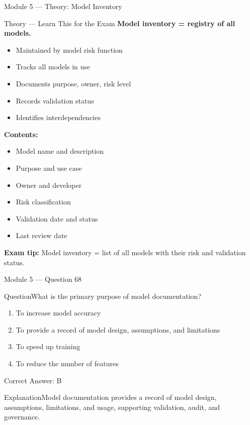 \documentclass[aspectratio=169,10pt]{beamer}
\newcommand{\question}[1]{\begin{block}{Question}#1\end{block}}
\newcommand{\options}[4]{%
	\begin{enumerate}[label=\Alph*.,leftmargin=*]
		\item #1
		\item #2
		\item #3
		\item #4
	\end{enumerate}
}
\newcommand{\answerbox}[1]{\begin{exampleblock}{Correct Answer: #1}\end{exampleblock}}
\newcommand{\explain}[1]{\begin{block}{Explanation}#1\end{block}}
\newcommand{\theory}[1]{%
	\begin{block}{Theory --- Learn This for the Exam}
		\small #1
	\end{block}
}
\begin{document}
	\begin{frame}{Module 5 --- Theory: Model Inventory}
		\theory{
			\textbf{Model inventory = registry of all models.}
			\begin{itemize}
				\item Maintained by model risk function
				\item Tracks all models in use
				\item Documents purpose, owner, risk level
				\item Records validation status
				\item Identifies interdependencies
			\end{itemize}
			\textbf{Contents:}
			\begin{itemize}
				\item Model name and description
				\item Purpose and use case
				\item Owner and developer
				\item Risk classification
				\item Validation date and status
				\item Last review date
			\end{itemize}
			\textbf{Exam tip:} Model inventory = list of all models with their risk and validation status.
		}
	\end{frame}
	
	\begin{frame}{Module 5 --- Question 68}
		\question{What is the primary purpose of model documentation?}
		\options{To increase model accuracy}{To provide a record of model design, assumptions, and limitations}{To speed up training}{To reduce the number of features}
		\answerbox{B}
		\explain{Model documentation provides a record of model design, assumptions, limitations, and usage, supporting validation, audit, and governance.}
	\end{frame}
	
\end{document}
